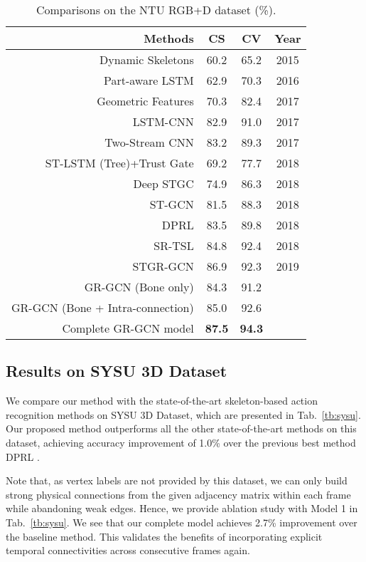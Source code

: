 \documentclass[conference]{IEEEtran}
\begin{document}
\begin{table}
  \centering
  \caption{Comparisons on the NTU RGB+D dataset (\%).}
  \label{tb:ntu}
  \begin{tabular}{rccc}
    \hline
     \textbf{Methods} & \textbf{CS} & \textbf{CV} & \textbf{Year} \\
    \hline
    Dynamic Skeletons \cite{Hu_2015_CVPR} & 60.2 & 65.2 & 2015 \\
    Part-aware LSTM \cite{Shahroudy_2016_CVPR} & 62.9 & 70.3 & 2016 \\
    Geometric Features \cite{zhang17}  & 70.3 & 82.4 & 2017 \\
    LSTM-CNN \cite{Li_2017_ICMEW} & 82.9 & 91.0 & 2017 \\
    Two-Stream CNN \cite{li17}  & 83.2 & 89.3 & 2017 \\
    ST-LSTM (Tree)+Trust Gate \cite{Liu_2018_TPAMI} & 69.2 & 77.7 & 2018 \\
    Deep STGC \cite{li18spatio}  & 74.9 & 86.3 & 2018 \\
    ST-GCN \cite{yan18}  & 81.5 & 88.3 & 2018 \\
    DPRL \cite{Tang_2018_CVPR}  & 83.5 & 89.8 & 2018 \\
    SR-TSL \cite{si18}  & 84.8 & 92.4 & 2018 \\
    STGR-GCN \cite{bi2019spatio} & 86.9 & 92.3 & 2019 \\
    \hline
    GR-GCN (Bone only) & 84.3 & 91.2 &  \\
    GR-GCN (Bone + Intra-connection) & 85.0 & 92.6 & \\
    Complete GR-GCN model & \textbf{87.5} & \textbf{94.3} & \\
    \hline
  \end{tabular}
\end{table}



\subsection{Results on SYSU 3D Dataset}

We compare our method with the state-of-the-art skeleton-based action recognition  methods on SYSU 3D Dataset, which are presented in Tab.~\ref{tb:sysu}. Our proposed method outperforms all the other state-of-the-art methods on this dataset, achieving accuracy improvement of 1.0\% over the previous best method DPRL \cite{Tang_2018_CVPR}. 

Note that, as vertex labels are not provided by this dataset, we can only build strong physical connections from the given adjacency matrix within each frame while abandoning weak edges. Hence, we provide ablation study with Model 1 in Tab.~\ref{tb:sysu}. We see that our complete model achieves 2.7\% improvement over the baseline method. This validates the benefits of incorporating explicit temporal connectivities across consecutive frames again. 
\end{document}
